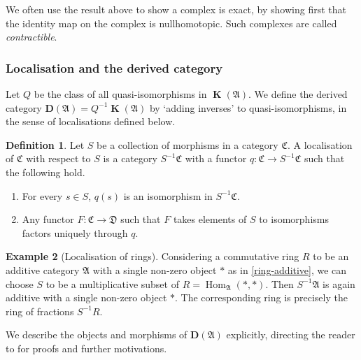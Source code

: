 \documentclass[a4paper]{article}
\theoremstyle{definition}
\newtheorem{defn}{Definition}[section]
\newtheorem{example}[defn]{Example}
\theoremstyle{remark}
\DeclareMathOperator{\Hom}{\text{Hom}}
\DeclareMathOperator{\kom}{{\mathbf{K}}}
\newcommand{\deri}{\mathbf{D}}
\begin{document}
We often use the result above to show a complex is exact, by showing first that
the identity map on the complex is nullhomotopic. Such complexes are called
\textit{contractible}.

\subsubsection{Localisation and the derived category}

Let \(Q\) be the class of all quasi-isomorphisms in \(\kom(\mathfrak{A})\). We
define the derived category \({\deri(\mathfrak{A})=Q^{-1}\kom(\mathfrak{A})}\) by
`adding inverses' to quasi-isomorphisms, in the sense of localisations defined
below. 

\begin{defn}\label{localisation-defn}
    Let \(S\) be a collection of morphisms in a category \(\mathfrak{C}\). A
    localisation of \(\mathfrak{C}\) with respect to \(S\) is a category
    \(S^{-1}\mathfrak{C}\) with a functor \(q:\mathfrak{C}\rightarrow
    S^{-1}\mathfrak{C}\) such that the following hold.
    \begin{enumerate}
        \item For every \(s\in S\), \(q(s)\) is an isomorphism in
            \(S^{-1}\mathfrak{C}\).
        \item Any functor \(F:\mathfrak{C}\rightarrow \mathfrak{D}\) such that
            \(F\) takes elements of \(S\) to isomorphisms factors uniquely
            through \(q\).
    \end{enumerate}
\end{defn}

\begin{example}[Localisation of rings]\label{example-ringlocal}
    Considering a commutative ring \(R\) to be an additive category
    \(\mathfrak{A}\) with a single non-zero object \(\ast\) as in
    \cref{ring-additive}, we can choose \(S\) to be a multiplicative subset of
    \(R=\Hom_{\mathfrak{A}}(\ast,\ast)\).  Then \(S^{-1}\mathfrak{A}\) is again
    additive with a single non-zero object \(\ast\). The corresponding ring is
    precisely the ring of fractions \(S^{-1}R\).
\end{example}

We describe the objects and morphisms of \(\deri(\mathfrak{A})\) explicitly,
directing the reader to  for proofs and
further motivations. 
\end{document}
